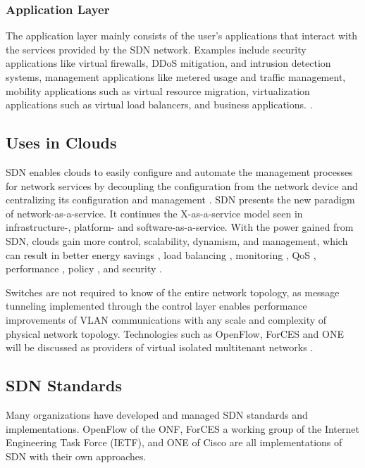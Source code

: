 \documentclass[fullapage,12pt]{article}
\begin{document}
\subsubsection{Application Layer}

The application layer mainly consists of the user's applications that interact with the services provided by the SDN network. Examples include security applications like virtual firewalls, DDoS mitigation, and intrusion detection systems, management applications like metered usage and traffic management, mobility applications such as virtual resource migration, virtualization applications such as virtual load balancers, and business applications. \cite{larsen2012architecture}.



\subsection{Uses in Clouds}

SDN enables clouds to easily configure and automate the management processes for network services by decoupling the configuration from the network device and centralizing its configuration and management \cite{yan2016software}. SDN presents the new paradigm of network-as-a-service. It continues the X-as-a-service model seen in infrastructure-, platform- and software-as-a-service. With the power gained from SDN, clouds gain more control, scalability, dynamism, and management, which can result in better energy savings \cite{yen2014sdn,lin2013flow}, load balancing \cite{yen2014sdn}, monitoring \cite{yen2014sdn}, QoS \cite{akella2014quality}, performance \cite{cziva2014sdn, lin2013flow}, policy \cite{banikazemi2013meridian,akella2014quality}, and security \cite{seeber2014improving}.

Switches are not required to know of the entire network topology, as message tunneling implemented through the control layer enables performance improvements of VLAN communications with any scale and complexity of physical network topology. Technologies such as OpenFlow, ForCES and ONE will be discussed as providers of virtual isolated multitenant networks \cite{wang2015survey}.




\subsection{SDN Standards}

Many organizations have developed and managed SDN standards and implementations. OpenFlow of the ONF, ForCES a working group of the Internet Engineering Task Force (IETF), and ONE of Cisco are all implementations of SDN with their own approaches.
\end{document}
